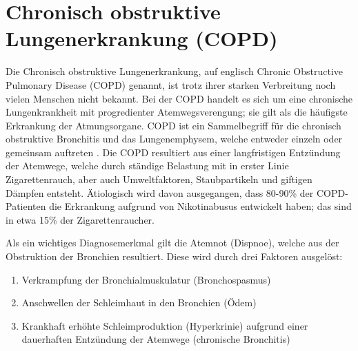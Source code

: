 \ifpdf
\graphicspath{{2_chronisch_obstruktive_lungenerkrankung/figures/PNG/}{2_chronisch_obstruktive_lungenerkrankung/figures/PDF/}{2_chronisch_obstruktive_lungenerkrankung/figures/}}
\else
    \graphicspath{{2_chronisch_obstruktive_lungenerkrankung/figures/EPS/}{2_chronisch_obstruktive_lungenerkrankung/figures/}}
\fi

\chapter{Chronisch obstruktive Lungenerkrankung (COPD)}
\label{chapter:copd}

Die Chronisch obstruktive Lungenerkrankung, auf englisch Chronic Obstructive Pulmonary Disease (COPD) genannt, ist trotz ihrer starken Verbreitung noch vielen Menschen nicht bekannt.
Bei der COPD handelt es sich um eine chronische Lungenkrankheit mit progredienter Atemwegsverengung; sie gilt als die häufigste Erkrankung der Atmungsorgane. COPD ist ein Sammelbegriff für die chronisch obstruktive Bronchitis und das Lungenemphysem, welche entweder einzeln oder gemeinsam auftreten \autocite[vgl.][153]{lorenz2009}.  Die COPD resultiert aus einer langfristigen Entzündung der Atemwege, welche durch ständige Belastung mit in erster Linie Zigarettenrauch, aber auch Umweltfaktoren, Staubpartikeln und giftigen Dämpfen entsteht. Ätiologisch wird davon ausgegangen, dass 80-90\% der COPD-Patienten die Erkrankung aufgrund von Nikotinabusus entwickelt haben; das sind in etwa 15\% der Zigarettenraucher\autocite[vgl.][154]{lorenz2009}. 

Als ein wichtiges Diagnosemerkmal gilt die Atemnot (Dispnoe), welche aus der Obstruktion der Bronchien resultiert. Diese wird durch drei Faktoren ausgelöst: 

\begin{enumerate}
\item Verkrampfung der Bronchialmuskulatur (Bronchospasmus)
\item Anschwellen der Schleimhaut in den Bronchien (Ödem)
\item Krankhaft erhöhte Schleimproduktion (Hyperkrinie) aufgrund einer dauerhaften Entzündung der Atemwege (chronische Bronchitis)
\end{enumerate}

